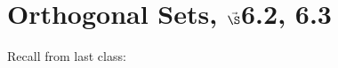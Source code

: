 


%

%
%

\section{{Orthogonal Sets, $\vec\S$6.2, 6.3}}%
% 

%
\thispagestyle{fancy}

Recall from last class:

